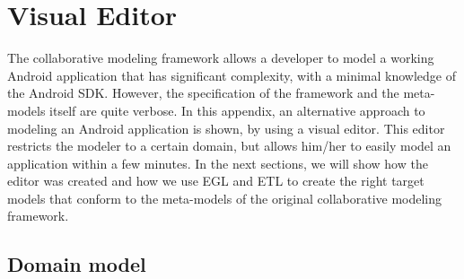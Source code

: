 \chapter{Visual Editor}
 
The collaborative modeling framework allows a developer to model a working Android application that has significant complexity, with a minimal knowledge of the Android SDK. However, the specification of the framework and the meta-models itself are quite verbose. In this appendix, an alternative approach to modeling an Android application is shown, by using a visual editor. This editor restricts the modeler to a certain domain, but allows him/her to easily model an application within a few minutes. In the next sections, we will show how the editor was created and how we use EGL and ETL to create the right target models that conform to the meta-models of the original collaborative modeling framework.

\section{Domain model}

